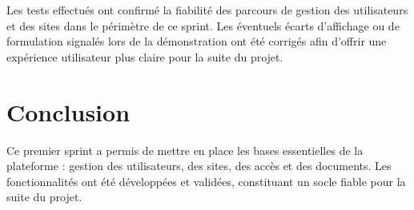 Les tests effectués ont confirmé la fiabilité des parcours de gestion des utilisateurs et des sites dans le périmètre de ce sprint. Les éventuels écarts d’affichage ou de formulation signalés lors de la démonstration ont été corrigés afin d’offrir une expérience utilisateur plus claire pour la suite du projet.

\section{Conclusion}

Ce premier sprint a permis de mettre en place les bases essentielles de la plateforme : gestion des utilisateurs, des sites, des accès et des documents. Les fonctionnalités ont été développées et validées, constituant un socle fiable pour la suite du projet.
